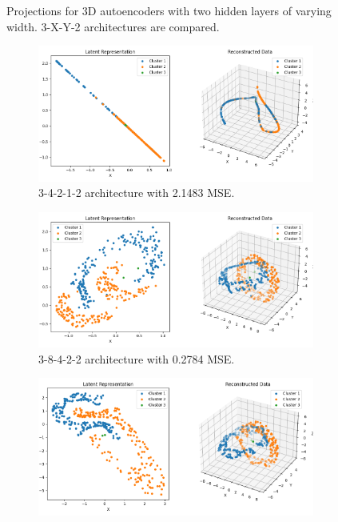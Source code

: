 \begin{figure}[htb]
  \caption{Projections for 3D autoencoders with two hidden layers of varying width. 3-X-Y-2 architectures are compared.}
  \label{fig:3-X-Y-2}
\end{figure}

\begin{figure}[htb]
  \centering
  \begin{subfigure}[b]{0.49\textwidth}
    \centering
    \includegraphics[width=\linewidth]{images/RQ1/3-4-2-1-2_2.1483.png}
    \caption{3-4-2-1-2 architecture with \textcolor{red!20!black}{2.1483} MSE.}
    \label{fig:3-4-2-1-2}
  \end{subfigure}
  \hfill
  \begin{subfigure}[b]{0.49\textwidth}
    \centering
    \includegraphics[width=\linewidth]{images/RQ1/3-8-4-2-2_0.2784.png}
    \caption{3-8-4-2-2 architecture with 0.2784 MSE.}
    \label{fig:3-8-4-2-2}
  \end{subfigure}
  \hfill
  \begin{subfigure}[b]{0.49\textwidth}
    \centering
    \includegraphics[width=\linewidth]{images/RQ1/3-16-8-4-2_0.1488.png}

\end{subfigure}
\end{figure}
